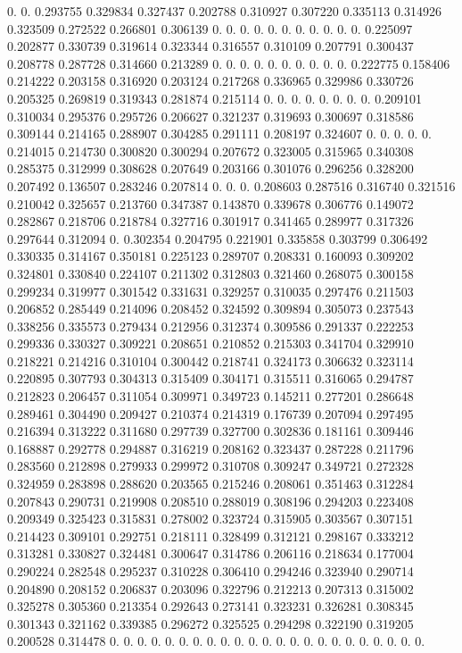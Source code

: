 0.  0.  0.293755   0.329834   0.327437   0.202788   0.310927   0.307220   0.335113   0.314926   0.323509   0.272522   0.266801   0.306139   0.  0.  0.  0.  0.  0.  0.  0.  0.  
0.  0.  0.225097   0.202877   0.330739   0.319614   0.323344   0.316557   0.310109   0.207791   0.300437   0.208778   0.287728   0.314660   0.213289   0.  0.  0.  0.  0.  0.  0.  0.  
0.  0.  0.222775   0.158406   0.214222   0.203158   0.316920   0.203124   0.217268   0.336965   0.329986   0.330726   0.205325   0.269819   0.319343   0.281874   0.215114   0.  0.  0.  0.  0.  0.  
0.  0.  0.209101   0.310034   0.295376   0.295726   0.206627   0.321237   0.319693   0.300697   0.318586   0.309144   0.214165   0.288907   0.304285   0.291111   0.208197   0.324607   0.  0.  0.  0.  0.  
0.214015   0.214730   0.300820   0.300294   0.207672   0.323005   0.315965   0.340308   0.285375   0.312999   0.308628   0.207649   0.203166   0.301076   0.296256   0.328200   0.207492   0.136507   0.283246   0.207814   0.  0.  0.  
0.208603   0.287516   0.316740   0.321516   0.210042   0.325657   0.213760   0.347387   0.143870   0.339678   0.306776   0.149072   0.282867   0.218706   0.218784   0.327716   0.301917   0.341465   0.289977   0.317326   0.297644   0.312094   0.  
0.302354   0.204795   0.221901   0.335858   0.303799   0.306492   0.330335   0.314167   0.350181   0.225123   0.289707   0.208331   0.160093   0.309202   0.324801   0.330840   0.224107   0.211302   0.312803   0.321460   0.268075   0.300158   0.299234   
0.319977   0.301542   0.331631   0.329257   0.310035   0.297476   0.211503   0.206852   0.285449   0.214096   0.208452   0.324592   0.309894   0.305073   0.237543   0.338256   0.335573   0.279434   0.212956   0.312374   0.309586   0.291337   0.222253   
0.299336   0.330327   0.309221   0.208651   0.210852   0.215303   0.341704   0.329910   0.218221   0.214216   0.310104   0.300442   0.218741   0.324173   0.306632   0.323114   0.220895   0.307793   0.304313   0.315409   0.304171   0.315511   0.316065   
0.294787   0.212823   0.206457   0.311054   0.309971   0.349723   0.145211   0.277201   0.286648   0.289461   0.304490   0.209427   0.210374   0.214319   0.176739   0.207094   0.297495   0.216394   0.313222   0.311680   0.297739   0.327700   0.302836   
0.181161   0.309446   0.168887   0.292778   0.294887   0.316219   0.208162   0.323437   0.287228   0.211796   0.283560   0.212898   0.279933   0.299972   0.310708   0.309247   0.349721   0.272328   0.324959   0.283898   0.288620   0.203565   0.215246   
0.208061   0.351463   0.312284   0.207843   0.290731   0.219908   0.208510   0.288019   0.308196   0.294203   0.223408   0.209349   0.325423   0.315831   0.278002   0.323724   0.315905   0.303567   0.307151   0.214423   0.309101   0.292751   0.218111   
0.328499   0.312121   0.298167   0.333212   0.313281   0.330827   0.324481   0.300647   0.314786   0.206116   0.218634   0.177004   0.290224   0.282548   0.295237   0.310228   0.306410   0.294246   0.323940   0.290714   0.204890   0.208152   0.206837   
0.203096   0.322796   0.212213   0.207313   0.315002   0.325278   0.305360   0.213354   0.292643   0.273141   0.323231   0.326281   0.308345   0.301343   0.321162   0.339385   0.296272   0.325525   0.294298   0.322190   0.319205   0.200528   0.314478   
0.  0.  0.  0.  0.  0.  0.  0.  0.  0.  0.  0.  0.  0.  0.  0.  0.  0.  0.  0.  0.  0.  0.  
